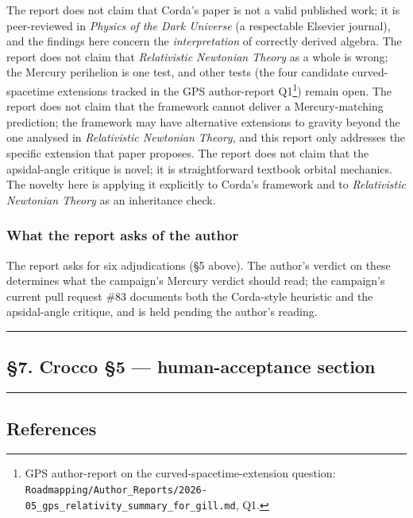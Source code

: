 \documentclass[
  11pt,
]{article}
\begin{document}
The report does not claim that Corda's paper is not a valid published
work; it is peer-reviewed in \emph{Physics of the Dark Universe} (a
respectable Elsevier journal), and the findings here concern the
\emph{interpretation} of correctly derived algebra. The report does not
claim that \emph{Relativistic Newtonian Theory} as a whole is wrong; the
Mercury perihelion is one test, and other tests (the four candidate
curved-spacetime extensions tracked in the GPS author-report
Q1\footnote{GPS author-report on the curved-spacetime-extension
  question:
  \texttt{Roadmapping/Author\_Reports/2026-05\_gps\_relativity\_summary\_for\_gill.md},
  Q1.}) remain open. The report does not claim that the framework cannot
deliver a Mercury-matching prediction; the framework may have
alternative extensions to gravity beyond the one analysed in
\emph{Relativistic Newtonian Theory}, and this report only addresses the
specific extension that paper proposes. The report does not claim that
the apsidal-angle critique is novel; it is straightforward textbook
orbital mechanics. The novelty here is applying it explicitly to Corda's
framework and to \emph{Relativistic Newtonian Theory} as an inheritance
check.

\hypertarget{what-the-report-asks-of-the-author}{%
\subsubsection{What the report asks of the
author}\label{what-the-report-asks-of-the-author}}

The report asks for six adjudications (§5 above). The author's verdict
on these determines what the campaign's Mercury verdict should read; the
campaign's current pull request \#83 documents both the Corda-style
heuristic and the apsidal-angle critique, and is held pending the
author's reading.

\begin{center}\rule{0.5\linewidth}{0.5pt}\end{center}

\hypertarget{crocco-5-human-acceptance-section}{%
\subsection{§7. Crocco §5 --- human-acceptance
section}\label{crocco-5-human-acceptance-section}}

\begin{center}\rule{0.5\linewidth}{0.5pt}\end{center}

\hypertarget{references}{%
\subsection{References}\label{references}}
\end{document}

